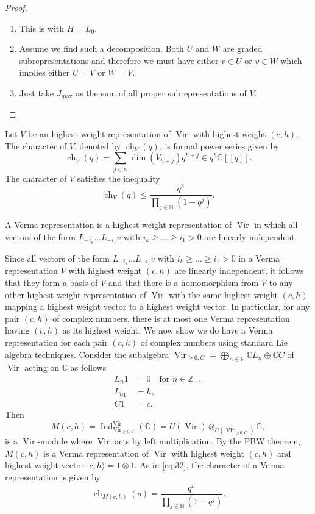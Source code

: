 \documentclass[a4paper, 12pt, reqno]{amsart}
\theoremstyle{remark}
\numberwithin{equation}{subsection}
\DeclareMathOperator{\Vir}{Vir}
\DeclareMathOperator{\ch}{ch}
\DeclareMathOperator{\Ind}{Ind}
\begin{document}
\begin{proof}\leavevmode
  \begin{enumerate}
  \item This is  with $H = L_0$.
  \item Assume we find such a decomposition.
    Both $U$ and $W$ are graded subrepresentations and therefore we must have either $v \in U$ or $v \in W$ which implies either $U = V$ or $W = V$.
  \item Just take $J_{\max}$ as the sum of all proper subrepresentations of $V$.\qedhere
  \end{enumerate}
\end{proof}

Let $V$ be an highest weight representation of $\Vir$ with highest weight $(c, h)$.
The character of $V$, denoted by $\ch_V(q)$, is formal power series given by
\begin{equation*}
  \ch_V(q) = \sum_{j \in \mathbb{N}}\dim(V_{h + j})q^{h + j} \in q^h\mathbb{C}[[q]].
\end{equation*}
The character of $V$ satisfies the inequality
\begin{equation*}
  \ch_V(q) \le \frac{q^h}{\prod_{j \in \mathbb{N}}(1 - q^j)}.
\end{equation*}

A Verma representation is a highest weight representation of $\Vir$ in which all vectors of the form $L_{-i_k}\dots L_{-i_1}v$ with $i_k \ge \dots \ge i_1 > 0$ are linearly independent.

Since all vectors of the form $L_{-i_k}\dots L_{-i_1}v$ with $i_k \ge \dots \ge i_1 > 0$ in a Verma representation $V$ with highest weight $(c, h)$ are linearly independent, it follows that they form a basis of $V$ and that there is a homomorphism from $V$ to any other highest weight representation of $\Vir$ with the same highest weight $(c, h)$ mapping a highest weight vector to a highest weight vector.
In particular, for any pair $(c, h)$ of complex numbers, there is at most one Verma representation having $(c, h)$ as its highest weight.
We now show we do have a Verma representation for each pair $(c, h)$ of complex numbers using standard Lie algebra techniques.
Consider the subalgebra $\Vir_{\ge 0, C} = \bigoplus_{n \in \mathbb{N}}\mathbb{C}L_n\oplus \mathbb{C}C$ of $\Vir$ acting on $\mathbb{C}$ as follows
\begin{align*}
  L_n1 &= 0 \quad \text{for }n \in \mathbb{Z}_+, \\
  L_01 &= h, \\
  C1 &= c.
\end{align*}
Then
\begin{equation*}
  M(c, h) = \Ind^{\Vir}_{\Vir_{\ge 0, C}}(\mathbb{C}) = U(\Vir) \otimes_{U(\Vir_{\ge 0, C})} \mathbb{C},
\end{equation*}
is a $\Vir$-module where $\Vir$ acts by left multiplication.
By the PBW theorem, $M(c, h)$ is a Verma representation of $\Vir$ with highest weight $(c, h)$ and highest weight vector $|c, h\rangle = 1\otimes1$.
As in \eqref{eq:32}, the character of a Verma representation is given by
\begin{equation*}
  \ch_{M(c, h)}(q) = \frac{q^h}{\prod_{j \in \mathbb{N}}(1 - q^j)}.
\end{equation*}
\end{document}
